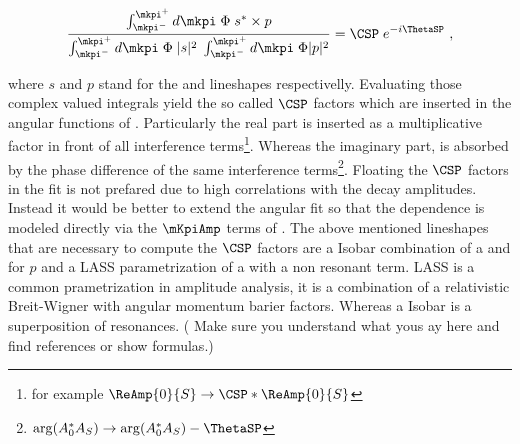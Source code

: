 \begin{equation}
  \label{csp_def}
  \frac{\int_{\mkpi^-}^{\mkpi^+} d\mkpi \; \Phi \; s^* \times p} {\int_{\mkpi^-}^{\mkpi^+} d\mkpi \; \Phi \; |s|^2 \; \int_{\mkpi^-}^{\mkpi^+} d\mkpi \; \Phi |p|^2} = \CSP \; e^{-i\ThetaSP} \ ,
\end{equation}

\noindent where $s$ and $p$ stand for the \swave and \pwave lineshapes respectivelly. Evaluating those complex valued integrals yield 
the so called $\CSP$ factors which are inserted in the angular functions of . Particularly the real part is inserted
as a multiplicative factor in front of all \spwave interference
terms\footnote{for example $\ReAmp{0}{S} \rightarrow \CSP * \ReAmp{0}{S} $}.
Whereas the imaginary part, is absorbed by the phase difference of the same interference 
terms\footnote{ $\arg(A_0^*A_S) \rightarrow \arg(A_0^*A_S) - \ThetaSP$}. Floating the $\CSP$ factors in the fit is not prefared due
to high correlations with the decay amplitudes. Instead it would be better to extend the angular fit so that the \mkpi dependence 
is modeled directly via the $\mKpiAmp$ terms of . The above mentioned lineshapes that are necessary
to compute the $\CSP$ factors are a Isobar combination of a \KstENT and \KstOFOZ for $p$ and a LASS parametrization of a \KstOFTZ
with a non resonant term. LASS is a common \swave prametrization in amplitude analysis, it is a combination of a relativistic Breit-Wigner
with angular momentum barier factors. Whereas a Isobar is a superposition of resonances. ({\color{red} Make sure you understand what yous ay here and find references or show formulas.})



